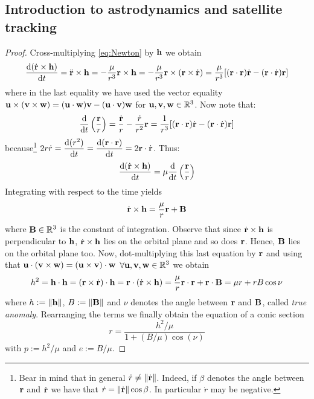 \documentclass[../main.tex]{subfiles}
\begin{document}
\subsection{Introduction to astrodynamics and satellite tracking}\label{sec:app2}
\keplerA*
\begin{proof}
  Cross-multiplying \cref{eq:Newton} by $\vf{h}$ we obtain
  \begin{equation}
    \dv{(\dot{\vf{r}}\times\vf{h})}{t}=\ddot{\vf{r}}\times\vf{h}=-\frac{\mu}{r^3}\vf{r}\times\vf{h}=-\frac{\mu}{r^3}\vf{r}\times(\vf{r}\times \dot{\vf{r}})=\frac{\mu}{r^3}[(\vf{r}\cdot{\vf{r}})\dot{\vf{r}}-(\vf{r}\cdot\dot{\vf{r}})\vf{r}]
  \end{equation}
  where in the last equality we have used the vector equality $\vf{u}\times(\vf{v}\times\vf{w})=(\vf{u}\cdot\vf{w})\vf{v}-(\vf{u}\cdot\vf{v})\vf{w}$ for $\vf{u}, \vf{v}, \vf{w}\in\RR^3$. Now note that:
  \begin{equation}
    \dv{}{t}\left(\frac{\vf{r}}{r}\right)=\frac{\dot{\vf{r}}}{r}-\frac{\dot{r}}{r^2}\vf{r}= \frac{1}{r^3}[(\vf{r}\cdot{\vf{r}})\dot{\vf{r}}-(\vf{r}\cdot\dot{\vf{r}})\vf{r}]
  \end{equation}
  because\footnote{Bear in mind that in general $\dot{r}\ne\norm{\dot{\vf{r}}}$. Indeed, if $\beta$ denotes the angle between $\vf{r}$ and $\dot{\vf{r}}$ we have that $\dot{r}=\norm{\dot{\vf{r}}}\cos\beta$. In particular $\dot{r}$ may be negative.} $\displaystyle 2r\dot{r}=\dv{(r^2)}{t}=\dv{(\vf{r}\cdot\vf{r})}{t}=2\vf{r}\cdot\dot{\vf{r}}$. Thus:
  \begin{equation}
    \dv{(\dot{\vf{r}}\times\vf{h})}{t}=\mu \dv{}{t}\left(\frac{\vf{r}}{r}\right)
  \end{equation}
  Integrating with respect to the time yields
  \begin{equation}
    \dot{\vf{r}}\times \vf{h}=\frac{\mu}{r}\vf{r}+\vf{B}
  \end{equation}
  where $\vf{B}\in\RR^3$ is the constant of integration. Observe that since $\dot{\vf{r}}\times\vf{h}$ is perpendicular to $\vf{h}$, $\dot{\vf{r}}\times\vf{h}$ lies on the orbital plane and so does $\vf{r}$. Hence, $\vf{B}$ lies on the orbital plane too. Now, dot-multiplying this last equation by $\vf{r}$ and using that $\vf{u}\cdot(\vf{v}\times\vf{w})=(\vf{u}\times\vf{v})\cdot\vf{w}$ $\forall\vf{u},\vf{v},\vf{w}\in\RR^3$ we obtain
  \begin{equation}
    h^2=\vf{h}\cdot\vf{h}=(\vf{r}\times\dot{\vf{r}})\cdot\vf{h}=\vf{r}\cdot(\dot{\vf{r}}\times\vf{h})=\frac{\mu}{r}\vf{r}\cdot\vf{r}+\vf{r}\cdot\vf{B}=\mu r+rB\cos\nu
  \end{equation}
  where $h:=\norm{\vf{h}}$, $B:=\norm{\vf{B}}$ and $\nu$ denotes the angle between $\vf{r}$ and $\vf{B}$, called \emph{true anomaly}. Rearranging the terms we finally obtain the equation of a conic section
  \begin{equation}
    r=\frac{h^2/\mu}{1+(B/\mu)\cos(\nu)}
  \end{equation}
  with $p:=h^2/\mu$ and $e:=B/\mu$.
\end{proof}
\end{document}

